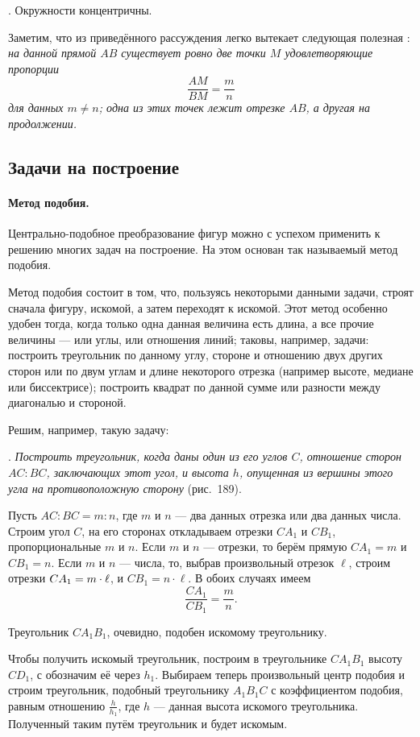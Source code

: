 \documentclass[twoside]{book}
\begin{document}
\smallskip
{}.
Окружности концентричны.

\smallskip

Заметим, что из приведённого рассуждения легко вытекает следующая полезная :
\emph{на данной прямой $AB$ существует ровно две точки $M$ удовлетворяющие пропорции \[\frac{AM}{BM}=\frac mn\] для данных $m\ne n$;
одна из этих точек лежит отрезке $AB$, а другая на продолжении. 
}

\subsection*{Задачи на построение}

\paragraph{Метод подобия.}\label{1938/181}
Центрально-подобное преобразование фигур можно с успехом применить к решению многих задач на построение.
На этом основан так называемый метод подобия.

Метод подобия состоит в том, что, пользуясь некоторыми данными задачи, строят сначала фигуру,  искомой, а затем переходят к искомой.
Этот метод особенно удобен тогда, когда только одна данная величина есть длина, а все прочие величины — или углы, или отношения линий;
таковы, например, задачи:
построить треугольник по данному углу, стороне и отношению двух других сторон или по двум углам и длине некоторого отрезка (например высоте, медиане или биссектрисе);
построить квадрат по данной сумме или разности между диагональю и стороной.

Решим, например, такую задачу:

\smallskip
{}.
\emph{Построить треугольник, когда даны один из его углов $C$, отношение сторон $AC:BC$, заключающих этот угол, и высота $h$, опущенная из вершины этого угла на противоположную сторону} (рис.~189).

Пусть $AC:BC=m:n$, где $m$ и $n$ — два данных отрезка или два данных числа.
Строим угол $C$, на его сторонах откладываем отрезки $CA_1$ и $CB_1$, пропорциональные $m$ и $n$.
Если $m$ и $n$ — отрезки, то берём прямую $CA_1=m$ и $CB_1=n$.
Если $m$ и $n$ — числа, то, выбрав произвольный отрезок $\ell$, строим отрезки $CA_1\z=m \cdot \ell$, и $CB_1=n\cdot \ell$.
В обоих случаях имеем
\[\frac{CA_1}{CB_1} = \frac mn.\]

Треугольник $CA_1B_1$, очевидно, подобен искомому треугольнику.

Чтобы получить искомый треугольник, построим в треугольнике $CA_1B_1$ высоту $CD_1$, с обозначим её через $h_1$.
Выбираем теперь произвольный центр подобия и строим треугольник, подобный треугольнику $A_1B_1C$ с коэффициентом подобия, равным отношению $\tfrac{h}{h_1}$,
где $h$ — данная высота искомого треугольника.
Полученный таким путём треугольник и будет искомым.
\end{document}
